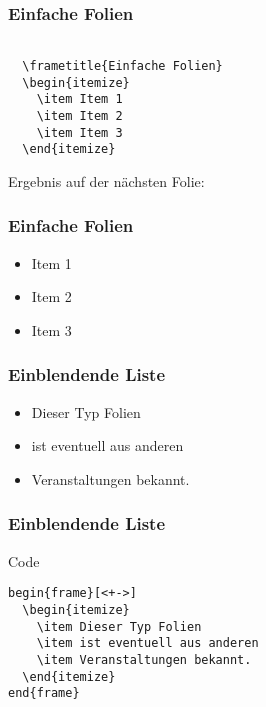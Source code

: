 \begin{frame}[fragile]
  \frametitle{Einfache Folien}
    \begin{verbatim}

  \frametitle{Einfache Folien}
  \begin{itemize}
    \item Item 1
    \item Item 2
    \item Item 3
  \end{itemize}

    \end{verbatim}
    Ergebnis auf der nächsten Folie:
\end{frame}
\begin{frame}
  \frametitle{Einfache Folien}
  \begin{itemize}
    \item Item 1
    \item Item 2
    \item Item 3
  \end{itemize}
\end{frame}
\begin{frame}[<+->]
  \frametitle{Einblendende Liste}
  \begin{itemize}
    \item Dieser Typ Folien
    \item ist eventuell aus anderen
    \item Veranstaltungen bekannt.
  \end{itemize}
\end{frame}
\begin{frame}[fragile]
  \frametitle{Einblendende Liste}
  \begin{block}{Code}
    \begin{verbatim}
begin{frame}[<+->]
  \begin{itemize}
    \item Dieser Typ Folien
    \item ist eventuell aus anderen
    \item Veranstaltungen bekannt.
  \end{itemize}
end{frame}
  \end{verbatim}
  \end{block}
\end{frame}
